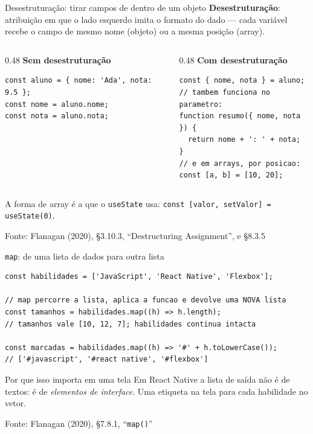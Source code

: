 \documentclass[aspectratio=169]{beamer}
\newcommand{\fonte}[1]{\vfill\hfill{\scriptsize\textcolor{UFSGray}{Fonte: #1}}}
\begin{document}
\begin{frame}[fragile]{Desestruturação: tirar campos de dentro de um objeto}
  \textbf{Desestruturação}: atribuição em que o lado esquerdo imita o formato
  do dado --- cada variável recebe o campo de mesmo nome (objeto) ou a mesma posição (array).
  \vspace{0.3em}
  \begin{columns}[T]
    \begin{column}{0.48\textwidth}
      \textbf{Sem desestruturação}
\begin{lstlisting}[style=jsx]
const aluno = { nome: 'Ada', nota: 9.5 };
const nome = aluno.nome;
const nota = aluno.nota;
\end{lstlisting}
    \end{column}
    \begin{column}{0.48\textwidth}
      \textbf{Com desestruturação}
\begin{lstlisting}[style=jsx]
const { nome, nota } = aluno;
// tambem funciona no parametro:
function resumo({ nome, nota }) {
  return nome + ': ' + nota;
}
// e em arrays, por posicao:
const [a, b] = [10, 20];
\end{lstlisting}
    \end{column}
  \end{columns}
  \begin{block}{}
    A forma de array é a que o \texttt{useState} usa: \texttt{const [valor, setValor] = useState(0)}.
  \end{block}
  \fonte{Flanagan (2020), \S 3.10.3, ``Destructuring Assignment'', e \S 8.3.5~\cite{flanagan2020javascript}}
\end{frame}

\begin{frame}[fragile]{\texttt{map}: de uma lista de dados para outra lista}
\begin{lstlisting}[style=js]
const habilidades = ['JavaScript', 'React Native', 'Flexbox'];

// map percorre a lista, aplica a funcao e devolve uma NOVA lista
const tamanhos = habilidades.map((h) => h.length);
// tamanhos vale [10, 12, 7]; habilidades continua intacta

const marcadas = habilidades.map((h) => '#' + h.toLowerCase());
// ['#javascript', '#react native', '#flexbox']
\end{lstlisting}
  \begin{block}{Por que isso importa em uma tela}
    Em React Native a lista de saída não é de textos: é de \emph{elementos
    de interface}. Uma etiqueta na tela para cada habilidade no vetor.
  \end{block}
  \fonte{Flanagan (2020), \S 7.8.1, ``\texttt{map()}''~\cite{flanagan2020javascript}}
\end{frame}
\end{document}
